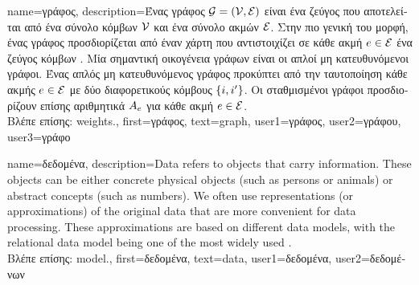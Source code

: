 {name={\foreignlanguage{greek}{γράφος}},
	description={\foreignlanguage{greek}{Ένας γράφος} $\mathcal{G} = \left( \mathcal{V},\mathcal{E} \right)$ \foreignlanguage{greek}{είναι 
		ένα ζεύγος που αποτελείται από ένα σύνολο κόμβων $\mathcal{V}$ και ένα σύνολο ακμών $\mathcal{E}$. Στην πιο γενική του μορφή, ένας γράφος 
		προσδιορίζεται από έναν χάρτη που αντιστοιχίζει σε κάθε ακμή $e \in \mathcal{E}$ ένα ζεύγος κόμβων} \cite{RockNetworks}. 
		\foreignlanguage{greek}{Μία σημαντική οικογένεια γράφων είναι οι απλοί μη κατευθυνόμενοι γράφοι. Ένας απλός μη κατευθυνόμενος  
		γράφος προκύπτει από την ταυτοποίηση κάθε ακμής $e \in \mathcal{E}$ με δύο διαφορετικούς κόμβους $\{i,i'\}$. 
		Οι σταθμισμένοι γράφοι προσδιορίζουν επίσης αριθμητικά}  $A_{e}$ 
		\foreignlanguage{greek}{για κάθε ακμή} $e \in \mathcal{E}$.\\
		\foreignlanguage{greek}{Βλέπε επίσης:} \gls{weights}.},
		first={\foreignlanguage{greek}{γράφος}},
		text={graph},
		user1={\foreignlanguage{greek}{γράφος}}, %
  		user2={\foreignlanguage{greek}{γράφου}}, %
		user3={\foreignlanguage{greek}{γράφο}} %
}

{name={\foreignlanguage{greek}{δεδομένα}},
	 description={Data refers to objects that carry information. These 
	 	objects can be either concrete physical objects (such as persons or animals) 
	 	or abstract concepts (such as numbers). We often use representations (or 
	 	approximations) of the original data that are more convenient for data processing. 
	 	These approximations are based on different data \gls{model}s, with the relational data 
	 	\gls{model} being one of the most widely used \cite{codd1970relational}.\\
		\foreignlanguage{greek}{Βλέπε επίσης:} \gls{model}.}, 
	first={\foreignlanguage{greek}{δεδομένα}},
	text={data},
	user1={\foreignlanguage{greek}{δεδομένα}}, %
  	user2={\foreignlanguage{greek}{δεδομένων}} %
}

